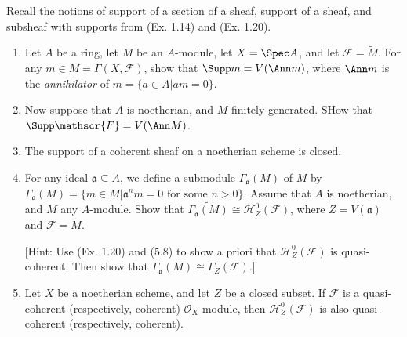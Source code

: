 \begin{exercise}[Support.] %
	Recall the notions of support of a section of a sheaf, support of a sheaf, and subsheaf with supports from (Ex. 1.14) and (Ex. 1.20).
	\begin{enumerate}
		\item Let $A $ be a ring, let $M $ be an $A $-module, let $X = \Spec A $, and let $\mathscr{F} = \tilde{M} $. For any $m \in M = \Gamma(X,\mathscr{F}) $, show that $\Supp m = V(\Ann m) $, where $\Ann m $ is the \textit{annihilator} of $m = \{a \in A | am = 0\}   $.
		\item Now suppose that $A $ is noetherian, and $M $ finitely generated. SHow that $\Supp \mathscr{F} = V(\Ann M) $.
		\item The support of a coherent sheaf on a noetherian scheme is closed.
		\item For any ideal $\mathfrak{a} \subseteq A $, we define a submodule $\Gamma_{\mathfrak{a}}(M) $ of $M $ by $\Gamma_{\mathfrak{a}}(M) = \{m \in M | \mathfrak{a}^n m = 0 \text{ for some }n > 0\}   $. Assume that $A $ is noetherian, and $M $ any $A $-module. Show that $\tilde{\Gamma_{\mathfrak{a}}(M)} \cong \mathscr{H}_Z^0(\mathscr{F}) $, where $Z = V(\mathfrak{a}) $ and $\mathscr{F} = \tilde{M} $.

			[Hint: Use (Ex. 1.20) and (5.8) to show a priori that $\mathscr{H}^{0}_{Z}(\mathscr{F}) $ is quasi-coherent. Then show that $\Gamma_{\mathfrak{a}}(M)\cong \Gamma _Z (\mathscr{F})$.]
		\item Let $X $ be a noetherian scheme, and let $Z $ be a closed subset. If $\mathscr{F} $ is a quasi-coherent (respectively, coherent) $\mathcal{O}_X $-module, then $\mathscr{H}_Z^0(\mathscr{F}) $ is also quasi-coherent (respectively, coherent).
	\end{enumerate}
\end{exercise}
